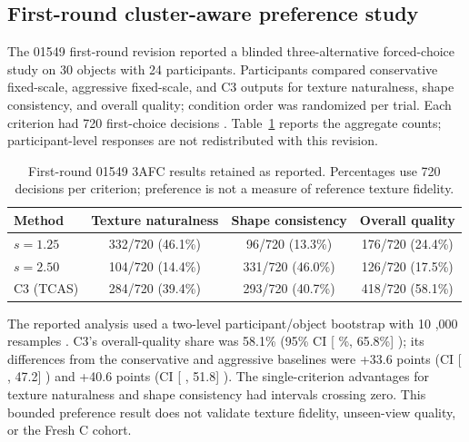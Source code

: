 \documentclass[times,twocolumn,final]{elsarticle}
\providecommand{\DIFadd}[1]{{\protect\color{blue} \sf #1}} %
\providecommand{\DIFaddbegin}{} %
\providecommand{\DIFaddend}{} %
\providecommand{\DIFaddFL}[1]{\DIFadd{#1}} %
\providecommand{\DIFaddbeginFL}{\DIFaddbegin} %
\providecommand{\DIFaddendFL}{\DIFaddend} %
\renewcommand{\DIFaddbeginFL}{}
\renewcommand{\DIFaddendFL}{}
\renewcommand{\DIFaddFL}[1]{#1}
\begin{document}
\subsection{First-round cluster-aware preference study}
\label{subsec:preference}

\DIFadd{The 01549 first-round revision reported }\DIFaddend a blinded three-alternative forced-choice   study on 30 objects   \DIFaddbegin \DIFadd{with 24 participants. Participants compared conservative fixed-scale, aggressive fixed-scale, and C3 outputs for }\DIFaddend texture naturalness, shape consistency,   \DIFaddbegin \DIFadd{and overall quality; condition order was randomized per trial. Each criterion had }\DIFaddend 720   first-choice decisions  \DIFaddbegin \DIFadd{. Table~\ref{tab:preference} reports the aggregate counts; participant-level responses are not redistributed with this revision}\DIFaddend .

  \DIFaddbeginFL \begin{table}[t]
\DIFaddendFL \centering  \DIFaddbeginFL \scriptsize
\caption{First-round 01549 3AFC results retained as reported. Percentages use 720 decisions per criterion; preference is not a measure of reference texture fidelity.}
\DIFaddendFL \label{tab:preference}
  \DIFaddbeginFL \setlength{\tabcolsep}{3pt}
\DIFaddendFL \begin{tabular}{lccc}
\toprule
Method & Texture naturalness   & Shape consistency   & Overall quality   \\
\midrule
  \DIFaddbeginFL \DIFaddFL{$s=1.25$ }\DIFaddendFL &   \DIFaddbeginFL \DIFaddFL{332/720 (46.1\%) }\DIFaddendFL & 96/720 (13.3\%) & 176/720 (24.4\%) \\
  \DIFaddbeginFL \DIFaddFL{$s=2.50$ }\DIFaddendFL & 104/720 (14.4\%) &   \DIFaddbeginFL \DIFaddFL{331/720 (46.0\%) }\DIFaddendFL & 126/720 (17.5\%) \\
C3 (TCAS) & 284/720 (39.4\%) & 293/720 (40.7\%) &   \DIFaddbeginFL \DIFaddFL{418/720 (58.1\%) }\DIFaddendFL \\
\bottomrule
\end{tabular}
\end{table}
  

The  
 \DIFaddbegin \DIFadd{reported analysis used }\DIFaddend a two-level   \DIFaddbegin \DIFadd{participant/object bootstrap with }\DIFaddend 10  \DIFaddbegin \DIFadd{,}\DIFaddend 000 resamples  . C3's overall-quality share   \DIFaddbegin \DIFadd{was }\DIFaddend 58.1\% (95\% CI   \DIFaddbegin [\DIFadd{50.1\%, 65.8\%}]\DIFadd{); its differences from }\DIFaddend the conservative and aggressive baselines   \DIFaddbegin \DIFadd{were +33.6 points (CI }[\DIFadd{19.3, 47.2}]\DIFadd{) and +40.6 }\DIFaddend points (CI   \DIFaddbegin [\DIFadd{29.4, 51.8}]\DIFadd{). The }\DIFaddend single-criterion advantages   \DIFaddbegin \DIFadd{for texture naturalness and shape consistency had intervals crossing zero. This bounded preference result does not validate texture fidelity, unseen-view quality, or the Fresh C cohort}\DIFaddend .
\end{document}

